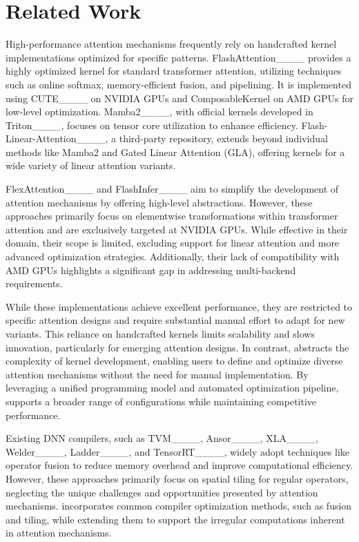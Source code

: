 \section{Related Work}
\vspace{-2mm}

High-performance attention mechanisms frequently rely on handcrafted kernel implementations optimized for specific patterns. FlashAttention____ provides a highly optimized kernel for standard transformer attention, utilizing techniques such as online softmax, memory-efficient fusion, and pipelining. It is implemented using CUTE____ on NVIDIA GPUs and ComposableKernel on AMD GPUs for low-level optimization.  Mamba2____, with official kernels developed in Triton____, focuses on tensor core utilization to enhance efficiency. Flash-Linear-Attention____, a third-party repository, extends beyond individual methods like Mamba2 and Gated Linear Attention (GLA), offering kernels for a wide variety of linear attention variants.

FlexAttention____ and FlashInfer____ aim to simplify the development of attention mechanisms by offering high-level abstractions. However, these approaches primarily focus on elementwise transformations within transformer attention and are exclusively targeted at NVIDIA GPUs. While effective in their domain, their scope is limited, excluding support for linear attention and more advanced optimization strategies. Additionally, their lack of compatibility with AMD GPUs highlights a significant gap in addressing multi-backend requirements.

While these implementations achieve excellent performance, they are restricted to specific attention designs and require substantial manual effort to adapt for new variants. This reliance on handcrafted kernels limits scalability and slows innovation, particularly for emerging attention designs. In contrast, \oursys{} abstracts the complexity of kernel development, enabling users to define and optimize diverse attention mechanisms without the need for manual implementation. By leveraging a unified programming model and automated optimization pipeline, \oursys{} supports a broader range of configurations while maintaining competitive performance.

Existing DNN compilers, such as TVM____, Ansor____, XLA____, Welder____, Ladder____, and TensorRT____, widely adopt techniques like operator fusion to reduce memory overhead and improve computational efficiency. However, these approaches primarily focus on spatial tiling for regular operators, neglecting the unique challenges and opportunities presented by attention mechanisms. \oursys{} incorporates common compiler optimization methods, such as fusion and tiling, while extending them to support the irregular computations inherent in attention mechanisms. 

